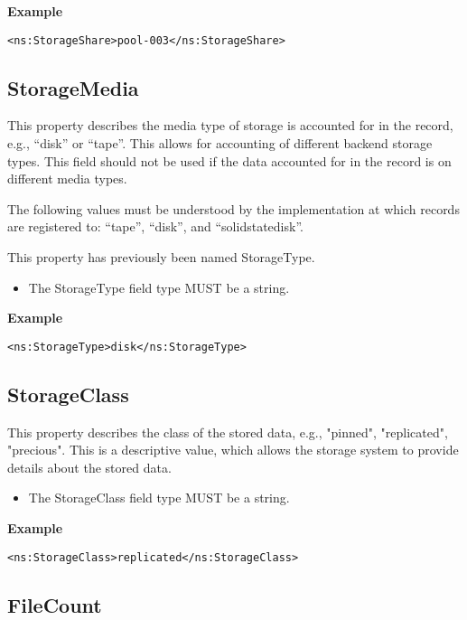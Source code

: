 {\bf Example}
\begin{verbatim}
<ns:StorageShare>pool-003</ns:StorageShare>
\end{verbatim}


\subsection{StorageMedia}

This property describes the media type of storage is accounted for in the
record, e.g., ``disk'' or ``tape''. This allows for accounting of different
backend storage types. This field should not be used if the data accounted for
in the record is on different media types.

The following values must be understood by the implementation at which records
are registered to: ``tape'', ``disk'', and ``solidstatedisk''.

This property has previously been named StorageType.

\begin{itemize}
\item The StorageType field type MUST be a string.
\end{itemize}

{\bf Example}
\begin{verbatim}
<ns:StorageType>disk</ns:StorageType>
\end{verbatim}



\subsection{StorageClass}

This property describes the class of the stored data, e.g., "pinned",
"replicated", "precious". This is a descriptive value, which allows the storage
system to provide details about the stored data.

\begin{itemize}
\item The StorageClass field type MUST be a string.
\end{itemize}

{\bf Example}
\begin{verbatim}
<ns:StorageClass>replicated</ns:StorageClass>
\end{verbatim}


\subsection{FileCount}

